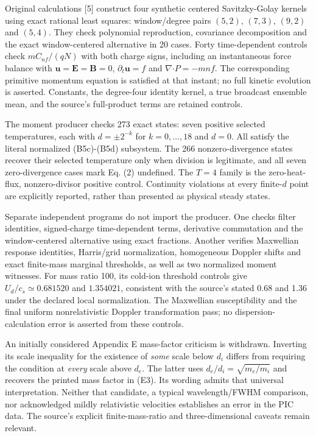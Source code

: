 Original calculations {[}5{]} construct four synthetic centered
Savitzky-Golay kernels using exact rational least squares: window/degree
pairs \((5,2)\), \((7,3)\), \((9,2)\) and \((5,4)\). They check
polynomial reproduction, covariance decomposition and the exact
window-centered alternative in 20 cases. Forty time-dependent controls
check \(mC_{nf}/(qN)\) with both charge signs, including an
instantaneous force balance with
\(\boldsymbol u=\boldsymbol E=\boldsymbol B=0\),
\(\partial_t\boldsymbol u=f\) and \(\nabla\boldsymbol{\cdot}P=-mnf\).
The corresponding primitive momentum equation is satisfied at that
instant; no full kinetic evolution is asserted. Constants, the
degree-four identity kernel, a true broadcast ensemble mean, and the
source's full-product terms are retained controls.

The moment producer checks 273 exact states: seven positive selected
temperatures, each with \(d=\pm2^{-k}\) for \(k=0,\ldots,18\) and
\(d=0\). All satisfy the literal normalized (B5c)-(B5d) subsystem. The
266 nonzero-divergence states recover their selected temperature only
when division is legitimate, and all seven zero-divergence cases mark
Eq. (2) undefined. The \(T=4\) family is the zero-heat-flux,
nonzero-divisor positive control. Continuity violations at every
finite-\(d\) point are explicitly reported, rather than presented as
physical steady states.

Separate independent programs do not import the producer. One checks
filter identities, signed-charge time-dependent terms, derivative
commutation and the window-centered alternative using exact fractions.
Another verifies Maxwellian response identities, Harris/grid
normalization, homogeneous Doppler shifts and exact finite-mass marginal
thresholds, as well as two normalized moment witnesses. For mass ratio
100, its cold-ion threshold controls give \(U_d/c_s\simeq0.681520\) and
\(1.354021\), consistent with the source's stated 0.68 and 1.36 under
the declared local normalization. The Maxwellian susceptibility and the
final uniform nonrelativistic Doppler transformation pass; no
dispersion-calculation error is asserted from these controls.

An initially considered Appendix E mass-factor criticism is withdrawn.
Inverting its scale inequality for the existence of \emph{some} scale
below \(d_i\) differs from requiring the condition at \emph{every} scale
above \(d_e\). The latter uses \(d_e/d_i=\sqrt{m_e/m_i}\) and recovers
the printed mass factor in (E3). Its wording admits that universal
interpretation. Neither that candidate, a typical wavelength/FWHM
comparison, nor acknowledged mildly relativistic velocities establishes
an error in the PIC data. The source's explicit finite-mass-ratio and
three-dimensional caveats remain relevant.

